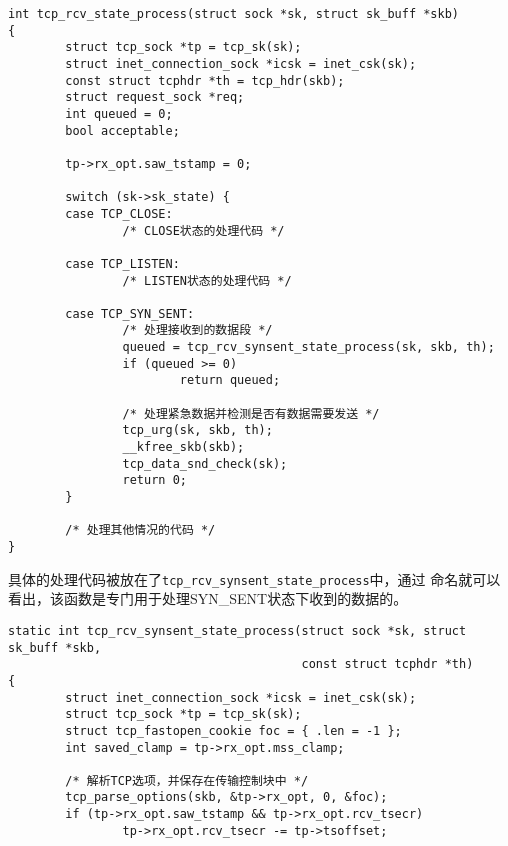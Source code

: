 \begin{verbatim}
int tcp_rcv_state_process(struct sock *sk, struct sk_buff *skb)
{
        struct tcp_sock *tp = tcp_sk(sk);
        struct inet_connection_sock *icsk = inet_csk(sk);
        const struct tcphdr *th = tcp_hdr(skb);
        struct request_sock *req;
        int queued = 0;
        bool acceptable;

        tp->rx_opt.saw_tstamp = 0;

        switch (sk->sk_state) {
        case TCP_CLOSE:
                /* CLOSE状态的处理代码 */

        case TCP_LISTEN:
                /* LISTEN状态的处理代码 */

        case TCP_SYN_SENT:
                /* 处理接收到的数据段 */
                queued = tcp_rcv_synsent_state_process(sk, skb, th);
                if (queued >= 0)
                        return queued;

                /* 处理紧急数据并检测是否有数据需要发送 */
                tcp_urg(sk, skb, th);
                __kfree_skb(skb);
                tcp_data_snd_check(sk);
                return 0;
        }

        /* 处理其他情况的代码 */
}
\end{verbatim}

具体的处理代码被放在了\texttt{tcp_rcv_synsent_state_process}中，通过
命名就可以看出，该函数是专门用于处理SYN\_SENT状态下收到的数据的。

\begin{verbatim}
static int tcp_rcv_synsent_state_process(struct sock *sk, struct sk_buff *skb,
                                         const struct tcphdr *th)
{
        struct inet_connection_sock *icsk = inet_csk(sk);
        struct tcp_sock *tp = tcp_sk(sk);
        struct tcp_fastopen_cookie foc = { .len = -1 };
        int saved_clamp = tp->rx_opt.mss_clamp;

        /* 解析TCP选项，并保存在传输控制块中 */
        tcp_parse_options(skb, &tp->rx_opt, 0, &foc);
        if (tp->rx_opt.saw_tstamp && tp->rx_opt.rcv_tsecr)
                tp->rx_opt.rcv_tsecr -= tp->tsoffset;
\end{verbatim}

